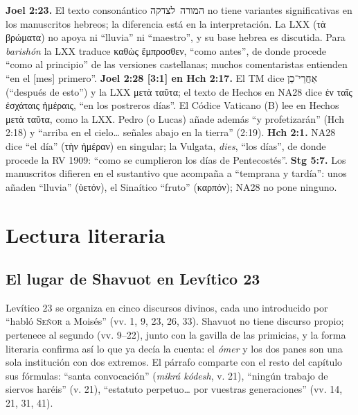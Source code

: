 \documentclass[11pt,letterpaper]{article}
\newcommand{\heb}[1]{\mbox{\foreignlanguage{hebrew}{#1}}}
\newcommand{\grc}[1]{\foreignlanguage{ancientgreek}{#1}}
\newcommand{\SENOR}{\textsc{Señor}}
\begin{document}
\begin{nota}
\textbf{Joel 2:23.} El texto consonántico \heb{המורה לצדקה} no tiene variantes significativas en los manuscritos hebreos; la diferencia está en la interpretación. La LXX (\grc{τὰ βρώματα}) no apoya ni ``lluvia'' ni ``maestro'', y su base hebrea es discutida. Para \emph{barishón} la LXX traduce \grc{καθὼς ἔμπροσθεν}, ``como antes'', de donde procede ``como al principio'' de las versiones castellanas; muchos comentaristas entienden ``en el [mes] primero''. \textbf{Joel 2:28 [3:1] en Hch 2:17.} El TM dice \heb{אַחֲרֵי־כֵן} (``después de esto'') y la LXX \grc{μετὰ ταῦτα}; el texto de Hechos en NA28 dice \grc{ἐν ταῖς ἐσχάταις ἡμέραις}, ``en los postreros días''. El Códice Vaticano (B) lee en Hechos \grc{μετὰ ταῦτα}, como la LXX. Pedro (o Lucas) añade además ``y profetizarán'' (Hch 2:18) y ``arriba en el cielo\ldots{} señales abajo en la tierra'' (2:19). \textbf{Hch 2:1.} NA28 dice ``el día'' (\grc{τὴν ἡμέραν}) en singular; la Vulgata, \emph{dies}, ``los días'', de donde procede la RV 1909: ``como se cumplieron los días de Pentecostés''. \textbf{Stg 5:7.} Los manuscritos difieren en el sustantivo que acompaña a ``temprana y tardía'': unos añaden ``lluvia'' (\grc{ὑετόν}), el Sinaítico ``fruto'' (\grc{καρπόν}); NA28 no pone ninguno.
\end{nota}

\section{Lectura literaria}

\subsection{El lugar de Shavuot en Levítico 23}

Levítico 23 se organiza en cinco discursos divinos, cada uno introducido por ``habló \SENOR{} a Moisés'' (vv. 1, 9, 23, 26, 33). Shavuot no tiene discurso propio; pertenece al segundo (vv. 9--22), junto con la gavilla de las primicias, y la forma literaria confirma así lo que ya decía la cuenta: el \emph{ómer} y los dos panes son una sola institución con dos extremos. El párrafo comparte con el resto del capítulo sus fórmulas: ``santa convocación'' (\emph{mikrá kódesh}, v. 21), ``ningún trabajo de siervos haréis'' (v. 21), ``estatuto perpetuo\ldots{} por vuestras generaciones'' (vv. 14, 21, 31, 41).
\end{document}
